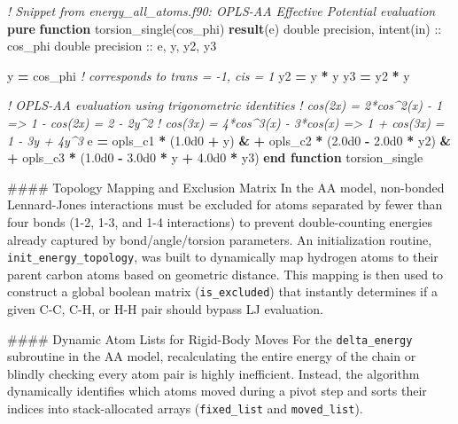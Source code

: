 \documentclass[
]{article}
\newenvironment{Shaded}{}{}
\newcommand{\CommentTok}[1]{\textcolor[rgb]{0.38,0.63,0.69}{\textit{#1}}}
\newcommand{\DataTypeTok}[1]{\textcolor[rgb]{0.56,0.13,0.00}{#1}}
\newcommand{\FloatTok}[1]{\textcolor[rgb]{0.25,0.63,0.44}{#1}}
\newcommand{\KeywordTok}[1]{\textcolor[rgb]{0.00,0.44,0.13}{\textbf{#1}}}
\newcommand{\NormalTok}[1]{#1}
\begin{document}
\begin{Shaded}
\begin{Highlighting}[]
\CommentTok{! Snippet from energy\_all\_atoms.f90: OPLS{-}AA Effective Potential evaluation}
\KeywordTok{pure} \KeywordTok{function}\NormalTok{ torsion\_single(cos\_phi) }\KeywordTok{result}\NormalTok{(e)}
  \DataTypeTok{double precision}\NormalTok{, }\DataTypeTok{intent(in)} \DataTypeTok{::}\NormalTok{ cos\_phi}
  \DataTypeTok{double precision} \DataTypeTok{::}\NormalTok{ e, y, y2, y3}

\NormalTok{  y }\KeywordTok{=}\NormalTok{ cos\_phi   }\CommentTok{! corresponds to trans = {-}1, cis = 1}
\NormalTok{  y2 }\KeywordTok{=}\NormalTok{ y }\KeywordTok{*}\NormalTok{ y}
\NormalTok{  y3 }\KeywordTok{=}\NormalTok{ y2 }\KeywordTok{*}\NormalTok{ y}

  \CommentTok{! OPLS{-}AA evaluation using trigonometric identities}
  \CommentTok{! cos(2x) = 2*cos\^{}2(x) {-} 1 =\textgreater{} 1 {-} cos(2x) = 2 {-} 2y\^{}2}
  \CommentTok{! cos(3x) = 4*cos\^{}3(x) {-} 3*cos(x) =\textgreater{} 1 + cos(3x) = 1 {-} 3y + 4y\^{}3}
\NormalTok{  e }\KeywordTok{=}\NormalTok{ opls\_c1 }\KeywordTok{*}\NormalTok{ (}\FloatTok{1.0d0} \KeywordTok{+}\NormalTok{ y) }\KeywordTok{\&}
    \KeywordTok{+}\NormalTok{ opls\_c2 }\KeywordTok{*}\NormalTok{ (}\FloatTok{2.0d0} \KeywordTok{{-}} \FloatTok{2.0d0} \KeywordTok{*}\NormalTok{ y2) }\KeywordTok{\&}
    \KeywordTok{+}\NormalTok{ opls\_c3 }\KeywordTok{*}\NormalTok{ (}\FloatTok{1.0d0} \KeywordTok{{-}} \FloatTok{3.0d0} \KeywordTok{*}\NormalTok{ y }\KeywordTok{+} \FloatTok{4.0d0} \KeywordTok{*}\NormalTok{ y3)}
\KeywordTok{end function}\NormalTok{ torsion\_single}
\end{Highlighting}
\end{Shaded}

\#\#\#\# Topology Mapping and Exclusion Matrix In the AA model,
non-bonded Lennard-Jones interactions must be excluded for atoms
separated by fewer than four bonds (1-2, 1-3, and 1-4 interactions) to
prevent double-counting energies already captured by bond/angle/torsion
parameters. An initialization routine, \texttt{init\_energy\_topology},
was built to dynamically map hydrogen atoms to their parent carbon atoms
based on geometric distance. This mapping is then used to construct a
global boolean matrix (\texttt{is\_excluded}) that instantly determines
if a given C-C, C-H, or H-H pair should bypass LJ evaluation.

\#\#\#\# Dynamic Atom Lists for Rigid-Body Moves For the
\texttt{delta\_energy} subroutine in the AA model, recalculating the
entire energy of the chain or blindly checking every atom pair is highly
inefficient. Instead, the algorithm dynamically identifies which atoms
moved during a pivot step and sorts their indices into stack-allocated
arrays (\texttt{fixed\_list} and \texttt{moved\_list}).
\end{document}
